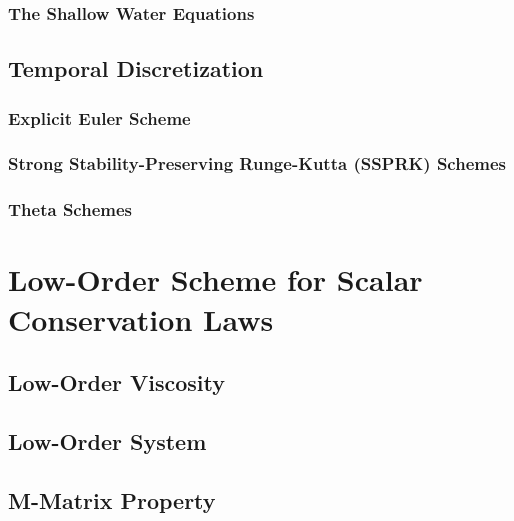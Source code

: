   \subsubsection{The Shallow Water Equations
    \label{sec:spatial_discretization_shallowwater}}
    
\subsection{Temporal Discretization\label{sec:temporal_discretization}}
  \subsubsection{Explicit Euler Scheme\label{sec:explicit_euler}}
    
  \subsubsection{Strong Stability-Preserving Runge-Kutta (SSPRK)
    Schemes\label{sec:ssprk}}
    
  \subsubsection{Theta Schemes\label{sec:theta}}
    
\section{Low-Order Scheme for Scalar Conservation Laws}\label{sec:low_order_scalar}
\subsection{Low-Order Viscosity\label{sec:low_order_viscosity_scalar}}
  
\subsection{Low-Order System\label{sec:low_order_scheme_scalar}}
  
\subsection{M-Matrix Property\label{sec:m_matrix}}
  
